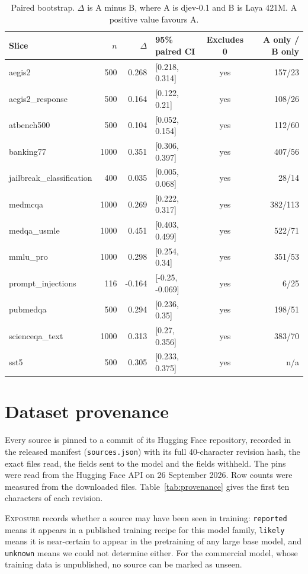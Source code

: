 \begin{table}[t]
\centering
\caption{Paired bootstrap. $\Delta$ is A minus B, where A is djev-0.1 and B is Laya 421M. A positive value favours A.}
\small
\begin{tabular}{lrrlcr}
\toprule
Slice & $n$ & $\Delta$ & 95\% paired CI & Excludes 0 & A only / B only \\
\midrule
  aegis2 & 500 & 0.268 & [0.218, 0.314] & yes & 157/23 \\
  aegis2\_response & 500 & 0.164 & [0.122, 0.21] & yes & 108/26 \\
  atbench500 & 500 & 0.104 & [0.052, 0.154] & yes & 112/60 \\
  banking77 & 1000 & 0.351 & [0.306, 0.397] & yes & 407/56 \\
  jailbreak\_classification & 400 & 0.035 & [0.005, 0.068] & yes & 28/14 \\
  medmcqa & 1000 & 0.269 & [0.222, 0.317] & yes & 382/113 \\
  medqa\_usmle & 1000 & 0.451 & [0.403, 0.499] & yes & 522/71 \\
  mmlu\_pro & 1000 & 0.298 & [0.254, 0.34] & yes & 351/53 \\
  prompt\_injections & 116 & -0.164 & [-0.25, -0.069] & yes & 6/25 \\
  pubmedqa & 500 & 0.294 & [0.236, 0.35] & yes & 198/51 \\
  scienceqa\_text & 1000 & 0.313 & [0.27, 0.356] & yes & 383/70 \\
  sst5 & 500 & 0.305 & [0.233, 0.375] & yes & n/a \\
\bottomrule
\end{tabular}
\end{table}


\section{Dataset provenance}
\label{app:provenance}

Every source is pinned to a commit of its Hugging Face repository, recorded in
the released manifest (\texttt{sources.json}) with its full 40-character
revision hash, the exact files read, the fields sent to the model and the fields
withheld. The pins were read from the Hugging Face API on 26 September 2026. Row
counts were measured from the downloaded files. Table~\ref{tab:provenance} gives
the first ten characters of each revision.

\textsc{Exposure} records whether a source may have been seen in training:
\texttt{reported} means it appears in a published training recipe for this model
family, \texttt{likely} means it is near-certain to appear in the pretraining of
any large base model, and \texttt{unknown} means we could not determine either.
For the commercial model, whose training data is unpublished, no source can be
marked as unseen.

